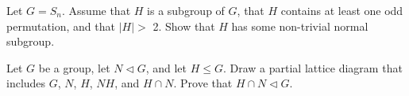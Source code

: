 \documentclass[12pt,letterpaper,boxed]{hmcpset}
\begin{document}
\begin{problem}[10.1.18]
Let $ G = S_n $. Assume that $H$ is a subgroup of $G$, that $H$ contains at least one odd permutation, and that $ \vert H \vert > $ 2. Show that $H$ has some non-trivial normal subgroup. 
\end{problem}

\begin{solution}

\end{solution}

\clearpage

\begin{problem}[10.2.5]
Let $G$ be a group, let $ N \triangleleft G $, and let $ H \leq G $. Draw a partial lattice diagram that includes $G$, $N$, $H$, $NH$, and $H \cap N$. Prove that $ H \cap N \triangleleft G $.
\end{problem}

\begin{solution}

\end{solution}
\end{document}

